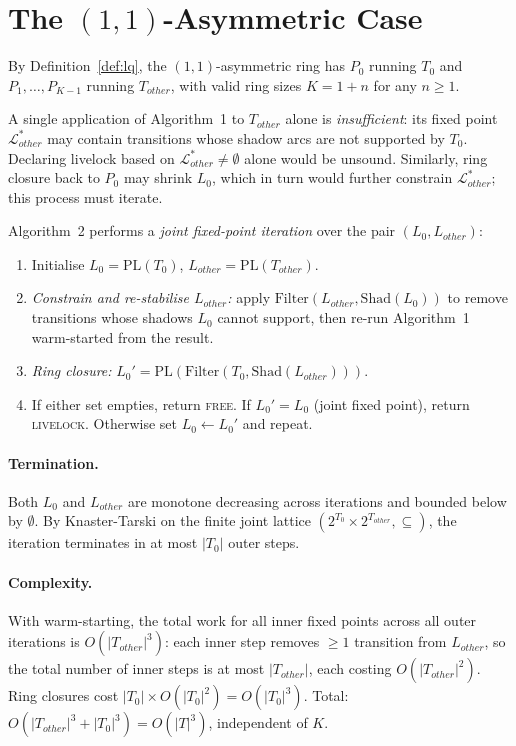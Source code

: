 \documentclass{article}
\newcommand{\Ls}{\mathcal{L}^{*}}
\newcommand{\PL}{\mathrm{PL}}
\newcommand{\Shad}{\mathrm{Shad}}
\newcommand{\Filter}{\mathrm{Filter}}
\begin{document}
\section{The $(1,1)$-Asymmetric Case}

By Definition~\ref{def:lq}, the $(1,1)$-asymmetric ring has $P_0$
running $T_0$ and $P_1,\ldots,P_{K-1}$ running $T_{\mathit{other}}$,
with valid ring sizes $K = 1+n$ for any $n\geq 1$.

A single application of Algorithm~1 to $T_{\mathit{other}}$ alone is
\emph{insufficient}: its fixed point $\Ls_{\mathit{other}}$ may contain
transitions whose shadow arcs are not supported by $T_0$.  Declaring
livelock based on $\Ls_{\mathit{other}}\neq\emptyset$ alone would be
unsound. Similarly, ring closure back to $P_0$ may shrink $L_0$, which
in turn would further constrain $\Ls_{\mathit{other}}$; this process
must iterate.

Algorithm~2 performs a \emph{joint fixed-point iteration} over the pair
$(L_0, L_{\mathit{other}})$:
\begin{enumerate}
\item Initialise $L_0 = \PL(T_0)$,
      $L_{\mathit{other}} = \PL(T_{\mathit{other}})$.
\item \emph{Constrain and re-stabilise $L_{\mathit{other}}$:} apply
      $\Filter(L_{\mathit{other}},\Shad(L_0))$ to remove transitions
      whose shadows $L_0$ cannot support, then re-run Algorithm~1
      warm-started from the result.
\item \emph{Ring closure:}
      $L_0' = \PL(\Filter(T_0,\Shad(L_{\mathit{other}})))$.
\item If either set empties, return \textsc{free}.
      If $L_0'=L_0$ (joint fixed point), return \textsc{livelock}.
      Otherwise set $L_0 \leftarrow L_0'$ and repeat.
\end{enumerate}

\paragraph{Termination.}
Both $L_0$ and $L_{\mathit{other}}$ are monotone decreasing across
iterations and bounded below by $\emptyset$.  By Knaster-Tarski on the
finite joint lattice $(2^{T_0}\!\times\!2^{T_{\mathit{other}}},\subseteq)$,
the iteration terminates in at most $|T_0|$ outer steps.

\paragraph{Complexity.}
With warm-starting, the total work for all inner fixed points across
all outer iterations is $O(|T_{\mathit{other}}|^3)$: each inner step
removes $\geq\!1$ transition from $L_{\mathit{other}}$, so the total
number of inner steps is at most $|T_{\mathit{other}}|$, each costing
$O(|T_{\mathit{other}}|^2)$.  Ring closures cost
$|T_0|\times O(|T_0|^2)=O(|T_0|^3)$.  Total:
$O(|T_{\mathit{other}}|^3+|T_0|^3)=O(|T|^3)$, independent of $K$.
\end{document}
